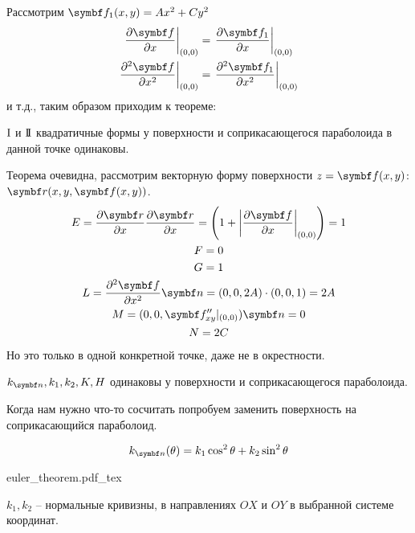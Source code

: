 \documentclass[main]{subfiles}
\begin{document}
Рассмотрим $\vf_1(x,y) = Ax^2 + Cy^2$
\begin{gather*}
    \left.\frac{\partial \vf}{\partial x} \right| _{(0,0)} = \left.\frac{\partial \vf_1}{\partial x} \right|_{(0,0)}\\
    \left.\frac{\partial^2 \vf}{\partial x^2} \right|_{(0,0)} = \left.\frac{\partial^2 \vf_1}{\partial x^2} \right|_{(0,0)}
\end{gather*}
и т.д., таким образом приходим к теореме:
\begin{theorem}
    $\mathrm{I}$ и $\mathrm{I\!I}$ квадратичные формы у поверхности и соприкасающегося параболоида в данной точке одинаковы.
\end{theorem}
Теорема очевидна, рассмотрим векторную форму поверхности $z = \vf(x,y)$: $\vr(x,y,\vf(x,y))$.
\begin{gather*}
    E = \frac{\partial \vr}{\partial x} \frac{\partial \vr}{\partial x} = \left(1 + \left|\frac{\partial \vf}{\partial x} \right|_{(0,0)}\right) = 1\\
    F = 0 \\
    G= 1\\
    L = \frac{\partial^2 \vf}{\partial x^2} \vn = (0,0,2A) \cdot (0,0,1) = 2A\\
    M = (0,0,\vf''_{xy}|_{(0,0)})\vn = 0\\
    N =  2C
\end{gather*}
Но это только в одной конкретной точке, даже не в окрестности.
\begin{corollary}
    $k_{\vn}, k_1, k_2, K, H$ одинаковы у поверхности и соприкасающегося параболоида.
\end{corollary}

Когда нам нужно что-то сосчитать попробуем заменить поверхность на соприкасающийся параболоид.
\begin{theorem}[Эйлера]
    \[k_{\vn} (\theta) = k_1 \cos^2 \theta + k_2 \sin^2 \theta\]
\end{theorem}
\begin{center}
    {euler_theorem.pdf_tex}
\end{center}
$k_1, k_2$ -- нормальные кривизны, в направлениях $OX$ и $OY$ в выбранной системе координат.
\end{document}
